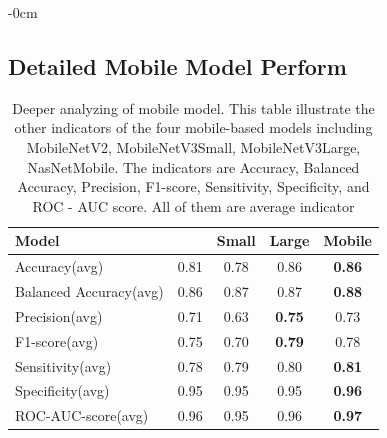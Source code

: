 \documentclass[sensors,article,submit,pdftex,moreauthors]{Definitions/mdpi}
\begin{document}
\begin{adjustwidth}{-\extralength}{0cm}
\subsection[\appendixname~\thesection]{Detailed Mobile Model Perform}
\begin{table}[H]
	\centering	
	\begin{tabular}{|l | c | c | c | c|} 
		\hline
		Model & \cite{04381} & \cite{02244}Small & \cite{02244}Large & \cite{07012}Mobile\\
		\hline
		Accuracy(avg) & 0.81 & 0.78 & 0.86 & \textbf{0.86}\\
		\hline
		Balanced Accuracy(avg) & 0.86 & 0.87 & 0.87 & \textbf{0.88}\\ 
		\hline
		Precision(avg) & 0.71 & 0.63 & \textbf{0.75} & 0.73\\
		\hline
		F1-score(avg) & 0.75 & 0.70 & \textbf{0.79} & 0.78\\
		\hline
		Sensitivity(avg) & 0.78 & 0.79 & 0.80 & \textbf{0.81}\\ 
		\hline
		Specificity(avg) & 0.95 & 0.95 & 0.95 & \textbf{0.96}\\
		\hline
		ROC-AUC-score(avg) & 0.96 & 0.95 & 0.96 & \textbf{0.97}\\
		\hline
	\end{tabular}
	\caption{Deeper analyzing of mobile model. This table illustrate the other indicators of the four mobile-based models including MobileNetV2, MobileNetV3Small, MobileNetV3Large, NasNetMobile. The indicators are Accuracy, Balanced Accuracy, Precision, F1-score, Sensitivity, Specificity, and ROC - AUC score. All of them are average indicator}
	\label{table:mobile-performance}
\end{table} 




%

\begin{thebibliography}{999}


\end{thebibliography}
\end{adjustwidth}
\end{document}
